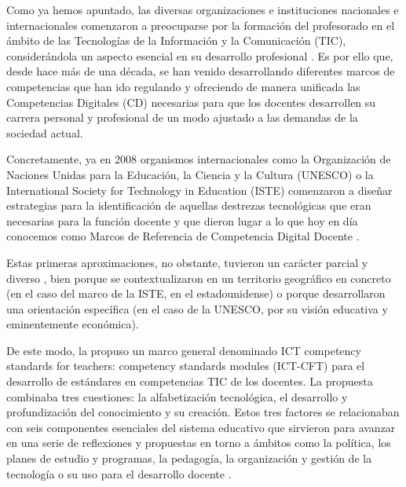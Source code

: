 \documentclass[spanish]{textolivre}
\begin{document}
Como ya hemos apuntado, las diversas organizaciones e instituciones nacionales e internacionales comenzaron a preocuparse por la formación del profesorado en el ámbito de las Tecnologías de la Información y la Comunicación (TIC), considerándola un aspecto esencial en su desarrollo profesional \cite{redecker_european_2017}. Es por ello que, desde hace más de una década, se han venido desarrollando diferentes marcos de competencias que han ido regulando y ofreciendo de manera unificada las Competencias Digitales (CD) necesarias para que los docentes desarrollen su carrera personal y profesional \cite{martin2022analysis} de un modo ajustado a las demandas de la sociedad actual.

Concretamente, ya en 2008 organismos internacionales como la Organización de Naciones Unidas para la Educación, la Ciencia y la Cultura (UNESCO) o la International Society for Technology in Education (ISTE) \cite{international_society_for_technology_in_education_national_2008} comenzaron a diseñar estrategias para la identificación de aquellas destrezas tecnológicas que eran necesarias para la función docente y que dieron lugar a lo que hoy en día conocemos como Marcos de Referencia de Competencia Digital Docente \cite{ferrando-rodriguez_crea_2023}. 

Estas primeras aproximaciones, no obstante, tuvieron un carácter parcial y diverso \cite{ramirez_martinell_marcos_2015}, bien porque se contextualizaron en un territorio geográfico en concreto (en el caso del marco de la ISTE, en el estadounidense) o porque desarrollaron una orientación específica (en el caso de la UNESCO, por su visión educativa y eminentemente económica).

De este modo, la \textcite{noauthor_unesco_2008} propuso un marco general denominado ICT competency standards for teachers: competency standards modules (ICT-CFT) para el desarrollo de estándares en competencias TIC de los docentes. La propuesta combinaba tres cuestiones: la alfabetización tecnológica, el desarrollo y profundización del conocimiento y su creación. Estos tres factores se relacionaban con seis componentes esenciales del sistema educativo que sirvieron para avanzar en una serie de reflexiones y propuestas en torno a ámbitos como la política, los planes de estudio y programas, la pedagogía, la organización y gestión de la tecnología o su uso para el desarrollo docente \cite{esteve-mon_competencia_2016}.
\end{document}
